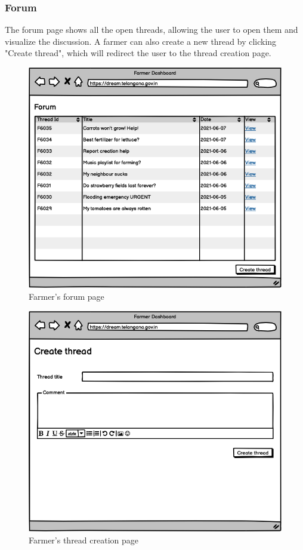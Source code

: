 \documentclass[10pt]{article} %
\begin{document}
\subsubsection{Forum}
The forum page shows all the open threads, allowing the user to open them and visualize the discussion.
A farmer can also create a new thread by clicking "Create thread", which will redirect the user to the thread creation page.\\
\begin{figure}[h!]
    \centering
    \centerline{\includegraphics[scale=0.54]{images/uimockups/f_forum.png}}
    \caption{Farmer's forum page}
    \label{fig:ui_f_forum}
\end{figure}
\newpage

\begin{figure}[h!]
    \centering
    \centerline{\includegraphics[scale=0.54]{images/uimockups/f_forumcreatethread.png}}
    \caption{Farmer's thread creation page}
    \label{fig:ui_f_forumcreatethread}
\end{figure}
\newpage
\end{document}
